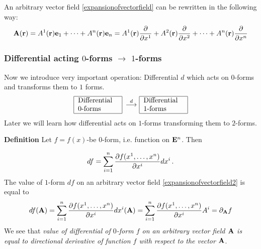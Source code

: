 \documentclass[12pt]{article}
\numberwithin{equation}{section}
\begin{document}
 An arbitrary vector field  \eqref{expansionofvectorfield} can be rewritten in the following way:
 \begin{equation}\label{expansionofvectorfield2}
    {\bf A}({\bf r})= A^1({\bf r}){\bf e}_1+\dots+A^n({\bf r}){\bf e}_n=A^1({\bf r}){\partial\over \partial x^1}+A^2({\bf r}){\partial\over \partial x^2}+
    \dots+A^n({\bf r}){\partial\over \partial x^n}
      \end{equation}


\m


 \subsubsection{ Differential acting  $0$-forms $\to$ $1$-forms}

\m

  Now we introduce very important operation: Differential $d$ which acts on $0$-forms and transforms them
  to $1$ forms.
                   $$
     \begin{tabular}{|p{ 2cm}|}
           \hline
            Differential 0-forms\cr
        \hline
      \end{tabular}
      \,\,\,
     {\buildrel d\over \longrightarrow}\,\,
      \begin{tabular}{|p{ 2cm}|}
           \hline
            Differential 1-forms\cr
        \hline
      \end{tabular}
                   $$
     Later we will learn how 
  differential acts on $1$-forms transforming them to $2$-forms.

\m

  {\bf Definition} Let $f=f(x)$-be $0$-form, i.e. function on ${\bf E}^n$.
   Then

   \begin{equation}\label{defofdif01}
    df=\sum_{i=1}^n{\partial f(x^1,\dots,x^n)\over\partial x^i}dx^i\,.
\end{equation}
   The value of $1$-form $df$
  on an arbitrary vector field \eqref{expansionofvectorfield2} is equal to
           \begin{equation}\label{defofdif02}
            df({\bf A})=\sum_{i=1}^n
   {\partial f(x^1,\dots,x^n)\over \partial x^i}dx^i({\bf A})=
    \sum_{i=1}^n{\partial f(x^1,\dots,x^n)\over \partial x^i}A^i=
            \partial_{{\bf A}}f
           \end{equation}
  We see that {\it value of differential of $0$-form $f$ on an arbitrary vector field ${\bf A}$
  is equal to directional derivative of function $f$ with respect to the vector ${\bf A}$}.
\end{document}
